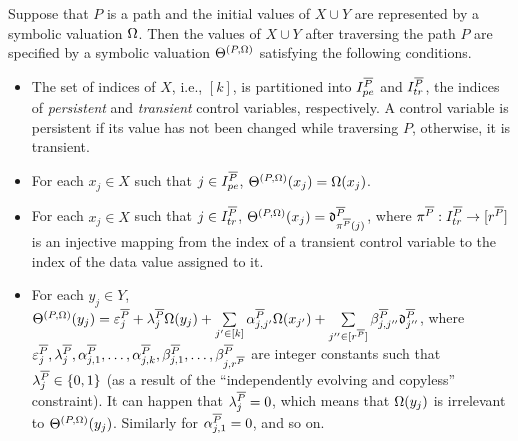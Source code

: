 \begin{proposition}\label{prop-sum-path}
Suppose that $P$ is a path and the initial values of $X \cup Y$ are represented by a symbolic valuation $\Omega$. Then the values of $X \cup Y$ after traversing the path $P$ are specified by a symbolic valuation $\Theta^{(P,\Omega)}$ satisfying the following conditions.
\begin{itemize}
\item The set of indices of $X$, i.e., $[k]$, is partitioned into $I^{\overline{P}}_{pe}$ and $I^{\overline{P}}_{tr}$, the indices of \emph{persistent} and \emph{transient} control variables, respectively. A control variable is persistent if its value has not been changed while traversing $P$, otherwise, it is transient.
\item For each $x_j\in X$ such that $j\in I^{\overline{P}}_{pe}$, $\Theta^{(P,\Omega)}(x_j)=\Omega(x_j)$.
%
\item  For each $x_j\in X$ such that $j\in I^{\overline{P}}_{tr}$,
$\Theta^{(P,\Omega)}(x_j)=\mathfrak{d}^{\overline{P}}_{\pi^{\overline{P}}(j)}$, where $\pi^{\overline{P}}: I^{\overline{P}}_{tr} \rightarrow [r^{\overline{P}}]$ is an injective mapping from the index of a transient control variable to the index of the data value assigned to it.
% 
\item For each $y_j \in Y$, 
$
 \Theta^{(P,\Omega)}(y_j)  =
 \varepsilon^{\overline{P}}_{j} + 
 \lambda^{\overline{P}}_j \Omega(y_j)  + 
  \sum\limits_{j'\in [k]}\alpha^{\overline{P}}_{j,j'}\Omega(x_{j'}) +
  \sum\limits_{j''\in [r^{\overline{P}}]}\beta^{\overline{P}}_{j,j''} \mathfrak{d}^{\overline{P}}_{j''}$,
where $\varepsilon^{\overline{P}}_j,\lambda^{\overline{P}}_j, \alpha^{\overline{P}}_{j,1},\dots,\alpha^{\overline{P}}_{j,k}, \beta^{\overline{P}}_{j,1},\dots,\beta^{\overline{P}}_{j,r^{\overline{P}}}$ are integer constants such that $\lambda^{\overline{P}}_{j} \in \{0,1\}$ (as a result of the ``independently evolving and copyless'' constraint).  It can happen that $\lambda^{\overline{P}}_j =0$,  which means that $\Omega(y_j)$ is irrelevant to $\Theta^{(P,\Omega)}(y_j)$. Similarly for $\alpha^{\overline{P}}_{j,1}=0$, and so on.
\end{itemize}
\end{proposition}
